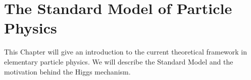 
\chapter{The Standard Model of Particle Physics}





This Chapter will give an introduction to the current theoretical framework in elementary particle physics.  We will describe the Standard Model and the motivation behind the Higgs mechanism.

